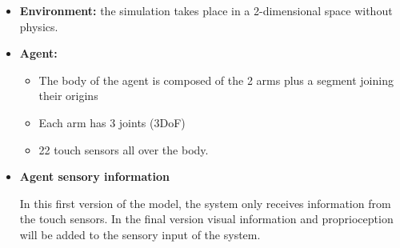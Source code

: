 \documentclass[11pt]{article}
\begin{document}
\begin{itemize}

    \item \textbf{Environment:} the simulation takes place in a 2-dimensional space
        without physics.

    \item \textbf{Agent:} \begin{itemize}

            \item The body of the agent is composed of the 2 arms plus a segment
                joining their origins

            \item Each arm has 3 joints (3DoF)

            \item 22 touch sensors all over the body.

        \end{itemize}

    \item \textbf{Agent sensory information}
    	
	In this first version of the model, the system only receives information from the touch sensors. In the final version visual information and proprioception will be added to the sensory input of the system.

        \begin{itemize}








\end{itemize}
\end{itemize}
\end{document}
